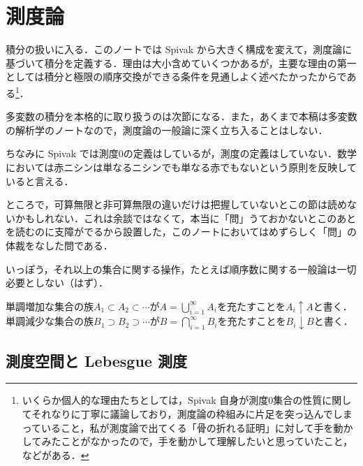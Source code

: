 \section{測度論}

積分の扱いに入る．このノートでは Spivak から大きく構成を変えて，測度論に基づいて積分を定義する．理由は大小含めていくつかあるが，主要な理由の第一としては積分と極限の順序交換ができる条件を見通しよく述べたかったからである\footnote{いくらか個人的な理由たちとしては，Spivak 自身が測度0集合の性質に関してそれなりに丁寧に議論しており，測度論の枠組みに片足を突っ込んでしまっていること，私が測度論で出てくる「骨の折れる証明」に対して手を動かしてみたことがなかったので，手を動かして理解したいと思っていたこと，などがある．}．

多変数の積分を本格的に取り扱うのは次節になる．また，あくまで本稿は多変数の解析学のノートなので，測度論の一般論に深く立ち入ることはしない．

\begin{dig}
ちなみに Spivak では測度0の定義はしているが，測度の定義はしていない．数学においては赤ニシンは単なるニシンでも単なる赤でもないという原則を反映していると言える．
\end{dig}

\begin{que}
ところで，可算無限と非可算無限の違いだけは把握していないとこの節は読めないかもしれない．これは余談ではなくて，本当に「問」うておかないとこのあとを読むのに支障がでるから設置した，このノートにおいてはめずらしく「問」の体裁をなした問である．
\end{que}

\begin{dig}
いっぽう，それ以上の集合に関する操作，たとえば順序数に関する一般論は一切必要としない（はず）．
\end{dig}

\begin{defi}
単調増加な集合の族$A_1 \subset A_2 \subset \dotsb$が$A = \bigcup_{i=1}^\infty A_i$を充たすことを$A_i \uparrow A$と書く．単調減少な集合の族$B_1 \supset B_2 \supset \dotsb$が$B = \bigcap_{i=1}^\infty B_i$を充たすことを$B_i \downarrow B$と書く．
\end{defi}

\subsection{測度空間と Lebesgue 測度}

